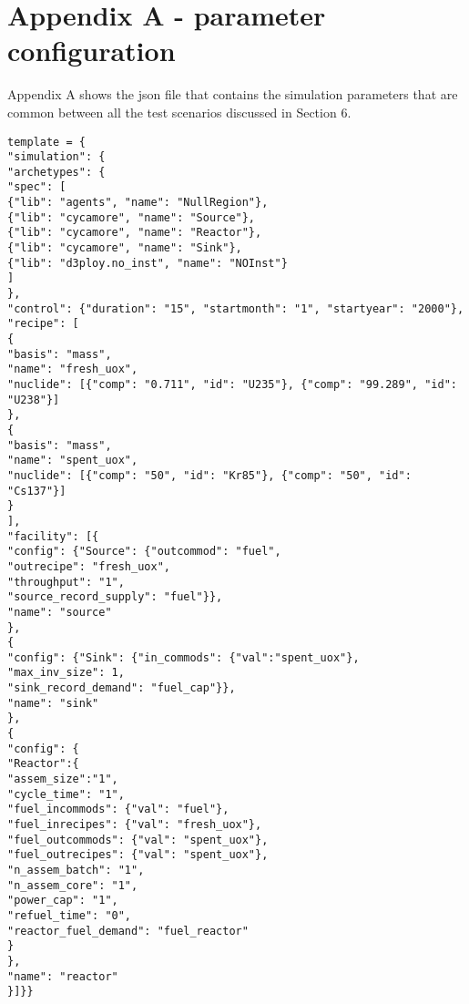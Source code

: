 \documentclass[11pt,letterpaper]{article}
\begin{document}
\begin{comment}
\item Do the related fuel cycle facilities exit upon demand decrease?
\begin{verbatim}
TEST(ReactorTests, DDDeploy_NO) {
    [Example input with the following attributes:]
        [int simdur = 20;]
        [Defines reactor with zero refueling cycle and operation 
        cycle of 1 month]
        [Defines fuel cycle facilities parameters]
        [Defines Reactor Deploy Scheme / Power Demand]
        [Decreasing Fuel Demand with Time]
    [Run test]
    [Test if fuel facility is deployed in the beginning]
    [Test if fuel facility exits later in the simulation (have 
    analytic solution)]
}
\end{verbatim}


\end{enumerate}



\section{Advanced Fuel Cycles}
\end{comment}

\section{Appendix A - parameter configuration}
Appendix A shows the json file that contains the simulation parameters that are common between all the test scenarios discussed in Section 6.  

\begin{verbatim}
template = {
"simulation": {
"archetypes": {
"spec": [
{"lib": "agents", "name": "NullRegion"}, 
{"lib": "cycamore", "name": "Source"}, 
{"lib": "cycamore", "name": "Reactor"},
{"lib": "cycamore", "name": "Sink"},
{"lib": "d3ploy.no_inst", "name": "NOInst"}
]
}, 
"control": {"duration": "15", "startmonth": "1", "startyear": "2000"}, 
"recipe": [
{
"basis": "mass", 
"name": "fresh_uox", 
"nuclide": [{"comp": "0.711", "id": "U235"}, {"comp": "99.289", "id": "U238"}]
}, 
{
"basis": "mass", 
"name": "spent_uox", 
"nuclide": [{"comp": "50", "id": "Kr85"}, {"comp": "50", "id": "Cs137"}]
}
], 
"facility": [{
"config": {"Source": {"outcommod": "fuel",
"outrecipe": "fresh_uox",
"throughput": "1",
"source_record_supply": "fuel"}}, 
"name": "source"
},
{
"config": {"Sink": {"in_commods": {"val":"spent_uox"},
"max_inv_size": 1,
"sink_record_demand": "fuel_cap"}}, 
"name": "sink"
},
{
"config": {
"Reactor":{
"assem_size":"1",
"cycle_time": "1", 
"fuel_incommods": {"val": "fuel"}, 
"fuel_inrecipes": {"val": "fresh_uox"}, 
"fuel_outcommods": {"val": "spent_uox"}, 
"fuel_outrecipes": {"val": "spent_uox"}, 
"n_assem_batch": "1", 
"n_assem_core": "1", 
"power_cap": "1", 
"refuel_time": "0",
"reactor_fuel_demand": "fuel_reactor"
}
},
"name": "reactor"
}]}}
\end{verbatim}
\end{document}
